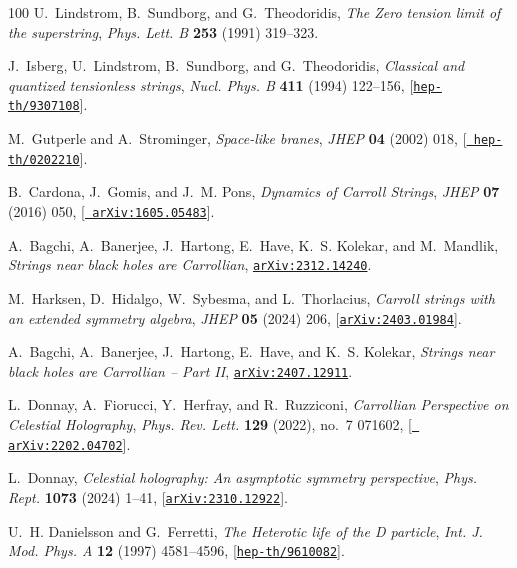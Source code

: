 \documentclass[11pt]{article}
\begin{document}
\begin{thebibliography}{100}
U.~Lindstrom, B.~Sundborg, and G.~Theodoridis, {\it {The Zero tension limit of
  the superstring}},  {\em Phys. Lett. B} {\bf 253} (1991) 319--323.

J.~Isberg, U.~Lindstrom, B.~Sundborg, and G.~Theodoridis, {\it {Classical and
  quantized tensionless strings}},  {\em Nucl. Phys. B} {\bf 411} (1994)
  122--156, [\href{http://arxiv.org/abs/hep-th/9307108}{{\tt hep-th/9307108}}].

M.~Gutperle and A.~Strominger, {\it {Space-like branes}},  {\em JHEP} {\bf 04}
  (2002) 018, [\href{http://arxiv.org/abs/hep-th/0202210}{{\tt
  hep-th/0202210}}].

B.~Cardona, J.~Gomis, and J.~M. Pons, {\it {Dynamics of Carroll Strings}},
  {\em JHEP} {\bf 07} (2016) 050, [\href{http://arxiv.org/abs/1605.05483}{{\tt
  arXiv:1605.05483}}].

A.~Bagchi, A.~Banerjee, J.~Hartong, E.~Have, K.~S. Kolekar, and M.~Mandlik,
  {\it {Strings near black holes are Carrollian}},
  \href{http://arxiv.org/abs/2312.14240}{{\tt arXiv:2312.14240}}.

M.~Harksen, D.~Hidalgo, W.~Sybesma, and L.~Thorlacius, {\it {Carroll strings
  with an extended symmetry algebra}},  {\em JHEP} {\bf 05} (2024) 206,
  [\href{http://arxiv.org/abs/2403.01984}{{\tt arXiv:2403.01984}}].

A.~Bagchi, A.~Banerjee, J.~Hartong, E.~Have, and K.~S. Kolekar, {\it {Strings
  near black holes are Carrollian -- Part II}},
  \href{http://arxiv.org/abs/2407.12911}{{\tt arXiv:2407.12911}}.

L.~Donnay, A.~Fiorucci, Y.~Herfray, and R.~Ruzziconi, {\it {Carrollian
  Perspective on Celestial Holography}},  {\em Phys. Rev. Lett.} {\bf 129}
  (2022), no.~7 071602, [\href{http://arxiv.org/abs/2202.04702}{{\tt
  arXiv:2202.04702}}].

L.~Donnay, {\it {Celestial holography: An asymptotic symmetry perspective}},
  {\em Phys. Rept.} {\bf 1073} (2024) 1--41,
  [\href{http://arxiv.org/abs/2310.12922}{{\tt arXiv:2310.12922}}].

U.~H. Danielsson and G.~Ferretti, {\it {The Heterotic life of the D particle}},
   {\em Int. J. Mod. Phys. A} {\bf 12} (1997) 4581--4596,
  [\href{http://arxiv.org/abs/hep-th/9610082}{{\tt hep-th/9610082}}].


\end{thebibliography}
\end{document}
